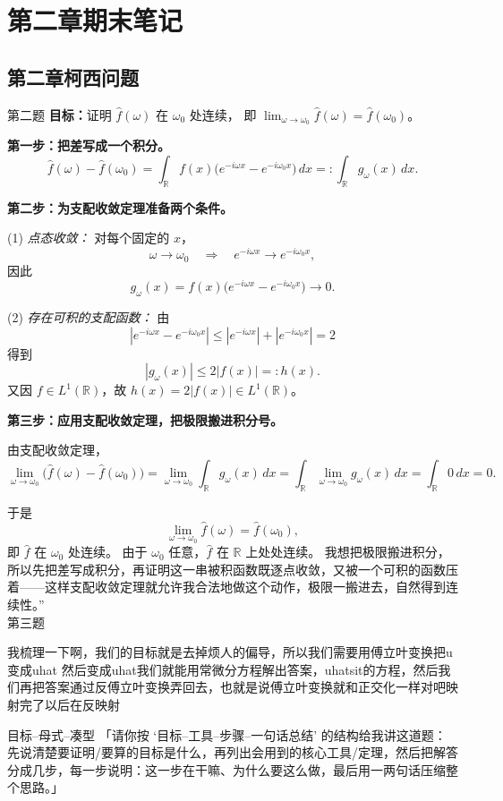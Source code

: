 
\chapter{第二章期末笔记}
\section{第二章柯西问题}
第二题
\textbf{目标：}证明 $\hat f(\omega)$ 在 $\omega_0$ 处连续，
即 $\displaystyle\lim_{\omega\to\omega_0}\hat f(\omega)=\hat f(\omega_0)$。

\textbf{第一步：把差写成一个积分。}
\[
\hat f(\omega)-\hat f(\omega_0)
=\int_{\mathbb R} f(x)\bigl(e^{-i\omega x}-e^{-i\omega_0 x}\bigr)\,dx
=: \int_{\mathbb R} g_\omega(x)\,dx.
\]

\textbf{第二步：为支配收敛定理准备两个条件。}

(1) \emph{点态收敛：}
对每个固定的 $x$，
\[
\omega\to\omega_0\quad\Rightarrow\quad
e^{-i\omega x}\to e^{-i\omega_0 x},
\]
因此
\[
g_\omega(x)=f(x)\bigl(e^{-i\omega x}-e^{-i\omega_0 x}\bigr)\to 0.
\]

(2) \emph{存在可积的支配函数：}
由
\[
|e^{-i\omega x}-e^{-i\omega_0 x}|
\le |e^{-i\omega x}|+|e^{-i\omega_0 x}|=2
\]
得到
\[
|g_\omega(x)|
\le 2|f(x)|=:h(x).
\]
又因 $f\in L^1(\mathbb R)$，故 $h(x)=2|f(x)|\in L^1(\mathbb R)$。

\textbf{第三步：应用支配收敛定理，把极限搬进积分号。}

由支配收敛定理，
\[
\lim_{\omega\to\omega_0}\bigl(\hat f(\omega)-\hat f(\omega_0)\bigr)
=\lim_{\omega\to\omega_0}\int_{\mathbb R} g_\omega(x)\,dx
=\int_{\mathbb R}\lim_{\omega\to\omega_0} g_\omega(x)\,dx
=\int_{\mathbb R}0\,dx=0.
\]

于是
\[
\lim_{\omega\to\omega_0}\hat f(\omega)=\hat f(\omega_0),
\]
即 $\hat f$ 在 $\omega_0$ 处连续。
由于 $\omega_0$ 任意，$\hat f$ 在 $\mathbb R$ 上处处连续。
我想把极限搬进积分，所以先把差写成积分，再证明这一串被积函数既逐点收敛，又被一个可积的函数压着——这样支配收敛定理就允许我合法地做这个动作，极限一搬进去，自然得到连续性。”
\\
第三题
\begin{dxtips}
    我梳理一下啊，我们的目标就是去掉烦人的偏导，所以我们需要用傅立叶变换把u变成uhat 然后变成uhat我们就能用常微分方程解出答案，uhatsit的方程，然后我们再把答案通过反傅立叶变换弄回去，也就是说傅立叶变换就和正交化一样对吧映射完了以后在反映射
\end{dxtips}
\begin{dxtips}[给chat的提示词]
    目标–母式–凑型
    「请你按 ‘目标–工具–步骤–一句话总结’ 的结构给我讲这道题：先说清楚要证明/要算的目标是什么，再列出会用到的核心工具/定理，然后把解答分成几步，每一步说明：这一步在干嘛、为什么要这么做，最后用一两句话压缩整个思路。」
\end{dxtips}
